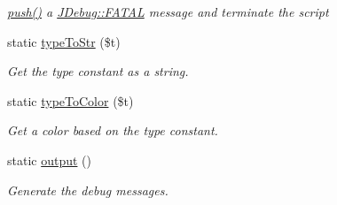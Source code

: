 \begin{DoxyCompactItemize}
\begin{DoxyCompactList}\small\item\em \hyperlink{classJDebug_ab101f91b0ab2610344e8efdb0fadb702}{push()} a \hyperlink{classJDebug_a40229b82ac0e4ae78bc6fed84d17e02e}{J\-Debug\-::\-F\-A\-T\-A\-L} message and terminate the script \end{DoxyCompactList}\item 
static \hyperlink{classJDebug_a9b991ce919c40cda6f7bac88e38fd752}{type\-To\-Str} (\$t)
\begin{DoxyCompactList}\small\item\em Get the type constant as a string. \end{DoxyCompactList}\item 
static \hyperlink{classJDebug_aeb77fc95a87477937a253aaf88600803}{type\-To\-Color} (\$t)
\begin{DoxyCompactList}\small\item\em Get a color based on the type constant. \end{DoxyCompactList}\item 
static \hyperlink{classJDebug_aced1c9f19ff49459cb2c1c8e5856c8cf}{output} ()
\begin{DoxyCompactList}\small\item\em Generate the debug messages. \end{DoxyCompactList}\end{DoxyCompactItemize}
